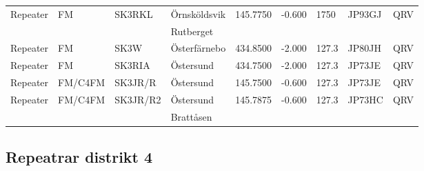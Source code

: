 \begin{longtable}{llllrrlll}
Repeater   & FM         & SK3RKL   & Örnsköldsvik     & 145.7750    & -0.600   & 1750       & JP93GJ & QRV  \\
           &            &          & Rutberget        &             &          &            &        &      \\
Repeater   & FM         & SK3W     & Österfärnebo     & 434.8500    & -2.000   & 127.3      & JP80JH & QRV  \\
Repeater   & FM         & SK3RIA   & Östersund        & 434.7500    & -2.000   & 127.3      & JP73JE & QRV  \\
Repeater   & FM/C4FM    & SK3JR/R  & Östersund        & 145.7500    & -0.600   & 127.3      & JP73JE & QRV  \\
Repeater   & FM/C4FM    & SK3JR/R2 & Östersund        & 145.7875    & -0.600   & 127.3      & JP73HC & QRV  \\
           &            &          & Brattåsen        &             &          &            &        &      \\
\end{longtable}
\normalsize

\clearpage

\subsection{Repeatrar distrikt 4}

